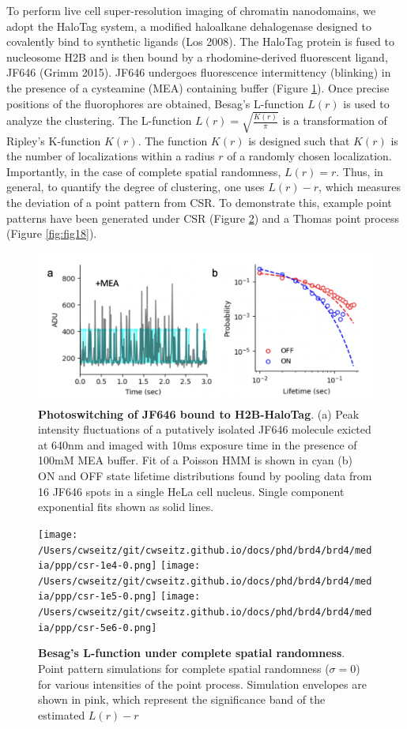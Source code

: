 To perform live cell super-resolution imaging of chromatin nanodomains, we adopt the HaloTag system, a modified haloalkane dehalogenase designed to covalently bind to synthetic ligands (Los 2008). The HaloTag protein is fused to nucleosome H2B and is then bound by a rhodomine-derived fluorescent ligand, JF646 (Grimm 2015). JF646 undergoes fluorescence intermittency (blinking) in the presence of a cysteamine (MEA) containing buffer (Figure \ref{fig:fig16}). Once precise positions of the fluorophores are obtained, Besag’s L-function $L(r)$ is used to analyze the clustering. The L-function $L(r)= \sqrt{\frac{K(r)}{\pi}}$ is a transformation of Ripley’s K-function $K(r)$. The function $K(r)$ is designed such that $K(r)$ is the number of localizations within a radius $r$ of a randomly chosen localization. Importantly, in the case of complete spatial randomness, $L(r)=r$. Thus, in general, to quantify the degree of clustering, one uses $L(r)-r$, which measures the deviation of a point pattern from CSR. To demonstrate this, example point patterns have been generated under CSR (Figure \ref{fig:fig17}) and a Thomas point process (Figure \ref{fig:fig18}).

\begin{figure}[b]
\centering
\includegraphics[width=13cm]{media/Lifetime.png}
\caption{\textbf{Photoswitching of JF646 bound to H2B-HaloTag}. (a) Peak intensity fluctuations of a putatively isolated JF646 molecule exicted at 640nm and imaged with 10ms exposure time in the presence of 100mM MEA buffer. Fit of a Poisson HMM is shown in cyan (b) ON and OFF state lifetime distributions found by pooling data from 16 JF646 spots in a single HeLa cell nucleus. Single component exponential fits shown as solid lines.}
\label{fig:fig16}
\end{figure}



\begin{figure}
\centering
\texttt{[image: /Users/cwseitz/git/cwseitz.github.io/docs/phd/brd4/brd4/media/ppp/csr-1e4-0.png]}
\texttt{[image: /Users/cwseitz/git/cwseitz.github.io/docs/phd/brd4/brd4/media/ppp/csr-1e5-0.png]}
\texttt{[image: /Users/cwseitz/git/cwseitz.github.io/docs/phd/brd4/brd4/media/ppp/csr-5e6-0.png]}
\caption{\textbf{Besag's L-function under complete spatial randomness}. Point pattern simulations for complete spatial randomness ($\sigma=0$) for various intensities of the point process. Simulation envelopes are shown in pink, which represent the significance band of the estimated $L(r)-r$}
\label{fig:fig17}
\end{figure}

